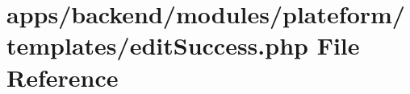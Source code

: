 \hypertarget{backend_2modules_2plateform_2templates_2edit_success_8php}{\section{apps/backend/modules/plateform/templates/edit\-Success.php File Reference}
\label{backend_2modules_2plateform_2templates_2edit_success_8php}
}
